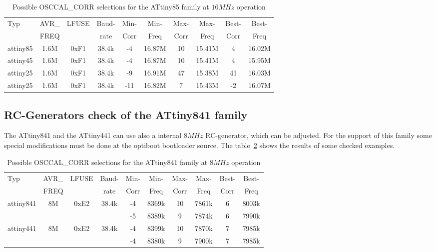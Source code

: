 \begin{table}[H]
  \begin{center}
    \begin{tabular}{| l | c | c | c || c | c || c | c || c | c |}
    \hline
   Typ  &       AVR\_ & LFUSE & Baud- & Min- & Min- & Max- & Max- & Best- & Best-  \\
        &       FREQ  &       & rate & Corr & Freq & Corr & Freq  & Corr  & Freq  \\
    \hline
    \hline
attiny85 &         1.6M & 0xF1  & 38.4k &  -4  & 16.87M &  10  & 15.41M  & 4  & 16.02M \\
    \hline
attiny45  &        1.6M & 0xF1  & 38.4k &  -4  & 16.87M & 10  & 15.41M  & 4  & 15.95M \\
    \hline
attiny25  &        1.6M & 0xF1  & 38.4k &  -9   & 16.91M & 47 & 15.38M  & 41  & 16.03M \\
attiny25  &        1.6M & 0xF1  & 38.4k &  -11  & 16.82M & 7  & 15.43M  & -2  & 16.07M \\
    \hline
    \end{tabular}
  \end{center}
  \caption{Possible OSCCAL\_CORR selections for the ATtiny85 family at \(16MHz\) operation}
  \label{tab:tiny85freq16}
\end{table}

\subsection{RC-Generators check of the ATtiny841 family}

The ATtiny841 and the ATtiny441 can use also a internal \(8MHz\) RC-generator,
which can be adjusted.
For the support of this family some special modifications must be done
at the optiboot bootloader source.
The table~\ref{tab:tiny841freq8} shows the results of some checked examples.

\begin{table}[H]
  \begin{center}
    \begin{tabular}{| l | c | c | c || c | c || c | c || c | c |}
    \hline
   Typ  &       AVR\_ & LFUSE & Baud- & Min- & Min- & Max- & Max- & Best- & Best-  \\
        &       FREQ  &       & rate & Corr & Freq & Corr & Freq  & Corr  & Freq  \\
    \hline
    \hline
attiny841 &          8M & 0xE2  & 38.4k &  -4  & 8369k & 10  & 7861k  & 6  & 8003k \\
          &             &       &       &  -5  & 8389k &  9  & 7874k  & 6  & 7990k \\
    \hline
attiny441  &         8M & 0xE2  & 38.4k &  -4  & 8399k & 10 & 7870k  & 7  & 7985k \\
           &            &       &       &  -4  & 8380k &  9 & 7900k  & 7  & 7985k \\
    \hline
    \end{tabular}
  \end{center}
  \caption{Possible OSCCAL\_CORR selections for the ATtiny841 family at \(8MHz\) operation}
  \label{tab:tiny841freq8}
\end{table}

